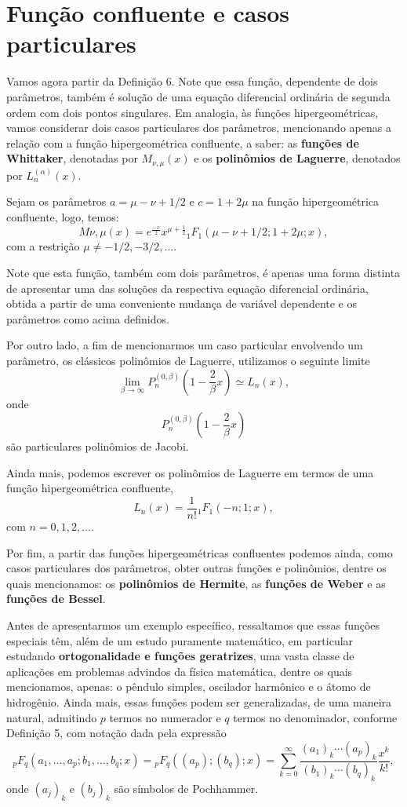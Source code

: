 \section{Função confluente e casos particulares}

Vamos agora partir da Definição 6. Note que essa função, dependente de dois parâmetros, também é solução de uma equação diferencial ordinária de segunda ordem com dois pontos singulares. Em analogia, às funções hipergeométricas, vamos considerar dois casos particulares dos parâmetros, mencionando apenas a relação com a função hipergeométrica confluente, a saber: as \textbf{funções de Whittaker}, denotadas por $M_{\nu ,\mu}(x)$ e os \textbf{polinômios de Laguerre}, denotados por $L^{(\alpha)}_{n}(x)$.

Sejam os parâmetros $a = \mu-\nu +1/2$ e $c = 1+2\mu$ na função hipergeométrica confluente, logo, temos:
$$M\nu ,\mu(x) = e^{\frac{-x}{2}} x^{\mu+\frac{1}{2}} {}_1F_1 (\mu - \nu + 1/2; 1 + 2\mu; x),$$
com a restrição $\mu \neq -1/2,-3/2, \ldots$.

Note que esta função, também com dois parâmetros, é apenas uma forma distinta de apresentar uma das soluções da respectiva equação diferencial ordinária, obtida a partir de uma conveniente mudança de variável dependente e os parâmetros como acima definidos.

Por outro lado, a fim de mencionarmos um caso particular envolvendo um parâmetro, os clássicos polinômios de Laguerre, utilizamos o seguinte limite
$$\lim_{\beta \to \infty} P^{(0, \beta)}_n \left(1-\dfrac{2}{\beta} x\right) \simeq L_n(x),$$
onde $$P^{(0,\beta)}_n\left(1 - \dfrac{2}{\beta} x\right)$$
são particulares polinômios de Jacobi.

Ainda mais, podemos escrever os polinômios de Laguerre em termos de uma função hipergeométrica confluente,
$$L_n(x) = \dfrac{1}{n!}{}_1F_1(-n; 1; x),$$
com $n = 0, 1, 2, \ldots$.

Por fim, a partir das funções hipergeométricas confluentes podemos ainda, como casos particulares dos parâmetros, obter outras funções e polinômios, dentre os quais mencionamos: os \textbf{polinômios de Hermite}, as \textbf{funções de Weber} e as \textbf{funções de Bessel}.

Antes de apresentarmos um exemplo específico, ressaltamos que essas funções especiais têm, além de um estudo puramente matemático, em particular estudando \textbf{ortogonalidade e funções geratrizes}, uma vasta classe de aplicações em problemas advindos da física matemática, dentre os quais mencionamos, apenas: o pêndulo simples, oscilador harmônico e o átomo de hidrogênio. Ainda mais, essas funções podem ser generalizadas, de uma maneira natural, admitindo $p$ termos no numerador e $q$ termos no denominador, conforme Definição 5, com notação dada pela expressão
$${}_pF_{q} (a_1, \ldots , a_p; b_1, \ldots, b_q; x) = {}_pF_{q}((a_p); (b_q); x) = \sum_{k=0}^{\infty} \dfrac{(a_1)_k \cdots (a_p)_k}{(b_1)_k \cdots (b_q)_k} \dfrac{x^k}{k!},$$
onde $(a_j)_k$ e $(b_j)_k$ são símbolos de Pochhammer.


